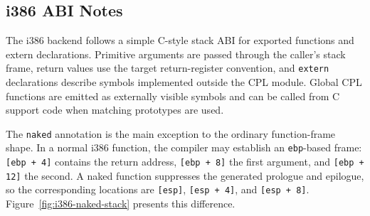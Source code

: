 \documentclass[10pt,twocolumn]{article}
\begin{document}
\subsection{i386 ABI Notes}
\label{sec:i386-abi}

\par The i386 backend follows a simple C-style stack ABI for exported functions and extern declarations. Primitive arguments are passed through the caller's stack frame, return values use the target return-register convention, and \texttt{extern} declarations describe symbols implemented outside the CPL module. Global CPL functions are emitted as externally visible symbols and can be called from C support code when matching prototypes are used.
\par The \texttt{naked} annotation is the main exception to the ordinary function-frame shape. In a normal i386 function, the compiler may establish an \texttt{ebp}-based frame: \texttt{[ebp + 4]} contains the return address, \texttt{[ebp + 8]} the first argument, and \texttt{[ebp + 12]} the second. A naked function suppresses the generated prologue and epilogue, so the corresponding locations are \texttt{[esp]}, \texttt{[esp + 4]}, and \texttt{[esp + 8]}. Figure~\ref{fig:i386-naked-stack} presents this difference.
\end{document}
